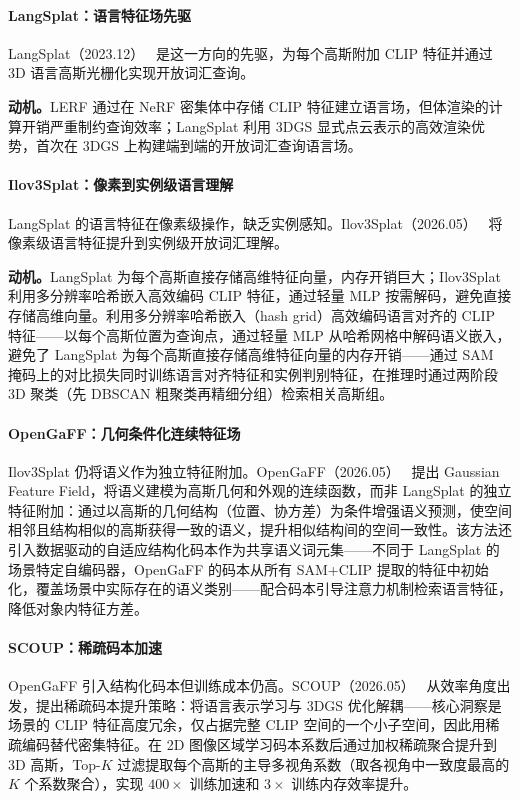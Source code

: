 \paragraph{LangSplat：语言特征场先驱} LangSplat（2023.12）~\cite{2312_16081} 是这一方向的先驱，为每个高斯附加 CLIP 特征并通过 3D 语言高斯光栅化实现开放词汇查询。

\textbf{动机。}LERF 通过在 NeRF 密集体中存储 CLIP 特征建立语言场，但体渲染的计算开销严重制约查询效率；LangSplat 利用 3DGS 显式点云表示的高效渲染优势，首次在 3DGS 上构建端到端的开放词汇查询语言场。

\paragraph{Ilov3Splat：像素到实例级语言理解} LangSplat 的语言特征在像素级操作，缺乏实例感知。Ilov3Splat（2026.05）~\cite{2605_04506} 将像素级语言特征提升到实例级开放词汇理解。

\textbf{动机。}LangSplat 为每个高斯直接存储高维特征向量，内存开销巨大；Ilov3Splat 利用多分辨率哈希嵌入高效编码 CLIP 特征，通过轻量 MLP 按需解码，避免直接存储高维向量。利用多分辨率哈希嵌入（hash grid）高效编码语言对齐的 CLIP 特征——以每个高斯位置为查询点，通过轻量 MLP 从哈希网格中解码语义嵌入，避免了 LangSplat 为每个高斯直接存储高维特征向量的内存开销——通过 SAM 掩码上的对比损失同时训练语言对齐特征和实例判别特征，在推理时通过两阶段 3D 聚类（先 DBSCAN 粗聚类再精细分组）检索相关高斯组。

\paragraph{OpenGaFF：几何条件化连续特征场} Ilov3Splat 仍将语义作为独立特征附加。OpenGaFF（2026.05）~\cite{2605_06088} 提出 Gaussian Feature Field，将语义建模为高斯几何和外观的连续函数，而非 LangSplat 的独立特征附加：通过以高斯的几何结构（位置、协方差）为条件增强语义预测，使空间相邻且结构相似的高斯获得一致的语义，提升相似结构间的空间一致性。该方法还引入数据驱动的自适应结构化码本作为共享语义词元集——不同于 LangSplat 的场景特定自编码器，OpenGaFF 的码本从所有 SAM+CLIP 提取的特征中初始化，覆盖场景中实际存在的语义类别——配合码本引导注意力机制检索语言特征，降低对象内特征方差。

\paragraph{SCOUP：稀疏码本加速} OpenGaFF 引入结构化码本但训练成本仍高。SCOUP（2026.05）~\cite{2605_13600} 从效率角度出发，提出稀疏码本提升策略：将语言表示学习与 3DGS 优化解耦——核心洞察是场景的 CLIP 特征高度冗余，仅占据完整 CLIP 空间的一个小子空间，因此用稀疏编码替代密集特征。在 2D 图像区域学习码本系数后通过加权稀疏聚合提升到 3D 高斯，Top-$K$ 过滤提取每个高斯的主导多视角系数（取各视角中一致度最高的 $K$ 个系数聚合），实现 $400\times$ 训练加速和 $3\times$ 训练内存效率提升。

